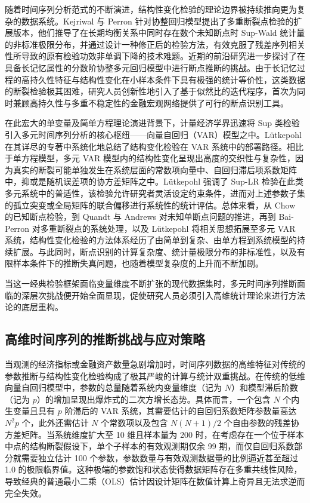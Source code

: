 \documentclass[UTF8,a4paper,12pt]{ctexbook}
\begin{document}
随着时间序列分析范式的不断演进，结构性变化检验的理论边界被持续推向更为复杂的数据系统。Kejriwal 与 Perron 针对协整回归模型提出了多重断裂点检验的扩展版本，他们推导了在长期均衡关系中同时存在数个未知断点时 Sup-Wald 统计量的非标准极限分布，并通过设计一种修正后的检验方法，有效克服了残差序列相关性所导致的原有检验功效非单调下降的技术难题。近期的前沿研究进一步探讨了在具备长记忆属性的分数阶协整多元回归模型中进行断点推断的挑战。由于长记忆过程的高持久性特征与结构性变化在小样本条件下具有极强的统计等价性，这类数据的断裂检验极其困难，研究人员创新性地引入了基于似然比的迭代程序，首次为同时兼顾高持久性与多重不稳定性的金融宏观网络提供了可行的断点识别工具。

在此宏大的单变量及简单方程理论演进背景下，计量经济学界迅速将 Sup 类检验引入多元时间序列分析的核心枢纽——向量自回归（VAR）模型之中。L{\"u}tkepohl 在其详尽的专著中系统化地总结了结构变化检验在 VAR 系统中的部署路径。相比于单方程模型，多元 VAR 模型内的结构性变化呈现出高度的交织性与复杂性，因为真实的断裂可能单独发生在系统层面的常数项向量中、自回归滞后项系数矩阵中，抑或是随机误差项的协方差矩阵之中。L{\"u}tkepohl 强调了 Sup-LR 检验在此类多元系统中的普适性，该检验允许研究者灵活设定约束条件，进而对上述参数子集的孤立突变或全局矩阵的联合偏移进行系统性的统计评估。总体来看，从 Chow 的已知断点检验，到 Quandt 与 Andrews 对未知单断点问题的推进，再到 Bai-Perron 对多重断裂点的系统处理，以及 L{\"u}tkepohl 将相关思想拓展至多元 VAR 系统，结构性变化检验的方法体系经历了由简单到复杂、由单方程到系统模型的持续扩展。与此同时，断点识别的计算复杂度、统计量极限分布的非标准性，以及有限样本条件下的推断失真问题，也随着模型复杂度的上升而不断加剧。


当这一经典检验框架面临变量维度不断扩张的现代数据集时，多元时间序列推断面临的深层次挑战便开始全面显现，促使研究人员必须引入高维统计理论来进行方法论的底层重构。

\subsection{高维时间序列的推断挑战与应对策略}

当观测的经济指标或金融资产数量急剧增加时，时间序列数据的高维特征对传统的参数推断与结构性变化检验构成了极其严峻的计算与统计双重挑战。在传统的低维向量自回归模型中，参数的总量随着系统内变量维度（记为 $N$）和模型滞后阶数（记为 $p$）的增加呈现出爆炸式的二次方增长态势。具体而言，一个包含 $N$ 个内生变量且具有 $p$ 阶滞后的 VAR 系统，其需要估计的自回归系数矩阵参数量高达 $N^2p$ 个，此外还需估计 $N$ 个常数项以及包含 $N(N+1)/2$ 个自由参数的残差协方差矩阵。当系统维度扩大至 10 维且样本量为 200 时，在考虑存在一个位于样本中点的结构断裂假设下，单个子样本的有效观测期仅余 99 期，而仅自回归系数部分就需要独立估计 100 个参数，参数数量与有效观测数据量的比例逼近甚至超过 1.0 的极限临界值。这种极端的参数饱和状态使得数据矩阵存在多重共线性风险，导致经典的普通最小二乘（OLS）估计因设计矩阵在数值计算上奇异且无法求逆而完全失效。
\end{document}
